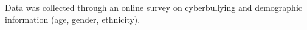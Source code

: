 Data was collected through an online survey on cyberbullying and demographic information (age, gender, ethnicity).